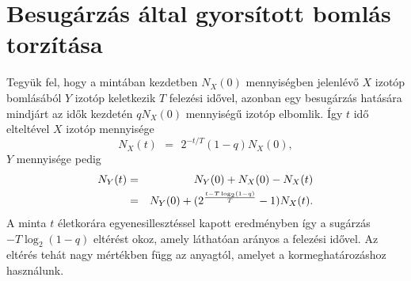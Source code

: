 \documentclass{article}[12pt]
\begin{document}
\section{Besugárzás által gyorsított bomlás torzítása}

Tegyük fel, hogy a mintában kezdetben $N_X(0)$ mennyiségben jelenlévő $X$
izotóp bomlásából $Y$ izotóp keletkezik $T$ felezési idővel, azonban egy
besugárzás hatására mindjárt az idők kezdetén $q N_X(0)$ mennyiségű izotóp
elbomlik. Így $t$ idő elteltével $X$ izotóp mennyisége
\begin{equation}
N_X(t)\,\ =\,\ 2^{-t/T}(1-q)N_X(0),
\end{equation}
$Y$ mennyisége pedig
\begin{eqnarray}
N_Y(t) &=& N_Y(0) + N_X(0) - N_X(t)\\
&=& N_Y(0) + (2^{t - T\log_2(1-q)\over T} - 1)N_X(t).
\end{eqnarray}
A minta $t$ életkorára egyenesillesztéssel kapott eredményben így a sugárzás
$-T\log_2(1-q)$ eltérést okoz, amely láthatóan arányos a felezési idővel. Az
eltérés tehát nagy mértékben függ az anyagtól, amelyet a kormeghatározáshoz
használunk.
\end{document}
